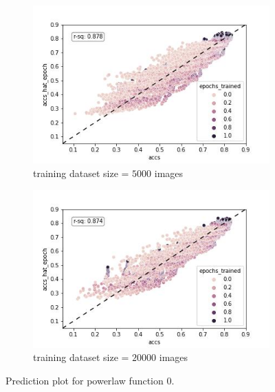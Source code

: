 \documentclass{article} %
\begin{document}
\begin{figure}
    \begin{subfigure}{.5\textwidth}
      \centering
      \includegraphics[width=.8\linewidth]{powerlaw_train_accs_hat_epoch}
      \caption{training dataset size = $5000$ images}
      \label{fig:powerlaw_acc_hat_epoch_train}
    \end{subfigure}%
    \begin{subfigure}{.5\textwidth}
      \centering
      \includegraphics[width=.8\linewidth]{powerlaw_val_accs_hat_epoch}
      \caption{training dataset size = $20000$ images}
      \label{fig:powerlaw_acc_hat_epoch_val}
    \end{subfigure}
    \caption{Prediction plot for powerlaw function 0.}
    \label{fig:powerlaw_acc_hat_epoch}
\end{figure}
\end{document}
